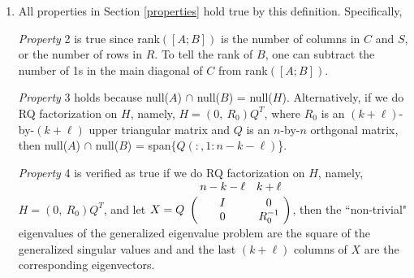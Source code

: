 \begin{enumerate}
\item All properties in Section \ref{properties} hold true by this definition. Specifically,
            
            \textit{Property} 2 is true since rank$([A; B])$ is the number of columns in $C$ and $S$, or the number of rows in $R$. To tell the rank of $B$, one can subtract the number of 1s in the main diagonal of $C$ from rank$([A; B])$.
            
            \textit{Property} 3 holds because null($A$) $\cap$ null($B$) = null($H$). Alternatively, if we do RQ factorization on $H$, namely, $H = (0, \ R_0)Q^T$, where $R_0$ is an $(k+\ell)$-by-$(k+\ell)$ upper triangular matrix and $Q$ is an $n$-by-$n$ orthgonal matrix, then null($A$) $\cap$ null($B$) = span$\{Q(:,1:n-k-\ell)$\}.
            
            \textit{Property} 4 is verified as true if we do RQ factorization on $H$, namely, $H = (0, \ R_0)Q^T$, and let $X = Q\bordermatrix{ & n-k-\ell & k+\ell   \cr
                       \hfill & I & 0 \cr
                       \hfill & 0 & R_0^{-1} }$, then
            the  ``non-trivial" eigenvalues of the generalized eigenvalue problem are the square of the generalized singular values and and the last $(k+\ell)$ columns of $X$ are the corresponding eigenvectors.  
\end{enumerate} 


        
\newpage 
